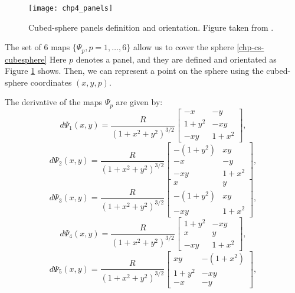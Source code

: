 \begin{figure}[!htb]
	\centering
	\texttt{[image: chp4\_panels]}
	\caption{Cubed-sphere panels definition and orientation.
    Figure taken from \citet{jung:2019}.\label{chp-cs-panels}}
\end{figure}


The set of 6 maps $\{\Psi_{p}, p = 1, \ldots, 6\}$ allow us to cover the sphere \ref{chp-cs-cubesphere}
Here $p$ denotes a panel, and they are defined and orientated as Figure \ref{chp-cs-panels}
shows. Then, we can represent a point on the sphere using the cubed-sphere coordinates
$(x,y,p)$.

The derivative of the maps $\Psi_p$ are given by:
\begin{equation*}
	d\Psi_{1}(x,y) = \frac{R}{{(1 + x^2 + y^2)}^{3/2}}
	\begin{bmatrix}
		-x & -y \\
	 	 1+y^2  & -xy \\
		 -xy  & 1+x^2
	\end{bmatrix},
\end{equation*}
\begin{equation*}
	d\Psi_{2}(x,y) = \frac{R}{{(1 + x^2 + y^2)}^{3/2}}
	\begin{bmatrix}
		-(1+y^2) & xy \\
		 -x &  -y \\
		 -xy &  1+x^2
	\end{bmatrix},
\end{equation*}
\begin{equation*}
	d\Psi_{3}(x,y) = \frac{R}{{(1 + x^2 + y^2)}^{3/2}}
	\begin{bmatrix}
		 x &  y \\
		-(1+y^2) & xy \\
		 -xy &  1+x^2
	\end{bmatrix},
\end{equation*}
\begin{equation*}
	d\Psi_{4}(x,y) = \frac{R}{{(1 + x^2 + y^2)}^{3/2}}	
	\begin{bmatrix}
		 1+y^2 &  -xy \\
		 x & y \\
		 -xy &  1+x^2
	\end{bmatrix},
\end{equation*}
\begin{equation*}
	d\Psi_{5}(x,y) = \frac{R}{{(1 + x^2 + y^2)}^{3/2}}	
	\begin{bmatrix}
		 xy  & -(1+x^2) \\
	 	 1+y^2  &  -xy \\
		-x & -y
	\end{bmatrix},
\end{equation*}

